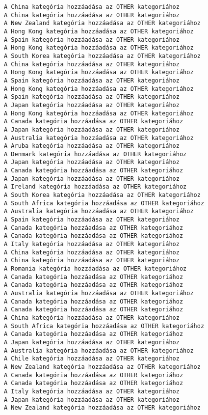 \documentclass[11pt]{article}
\begin{document}
\begin{Verbatim}[commandchars=\\\{\}]
A China kategória hozzáadása az OTHER kategoriához
A China kategória hozzáadása az OTHER kategoriához
A New Zealand kategória hozzáadása az OTHER kategoriához
A Hong Kong kategória hozzáadása az OTHER kategoriához
A Spain kategória hozzáadása az OTHER kategoriához
A Hong Kong kategória hozzáadása az OTHER kategoriához
A South Korea kategória hozzáadása az OTHER kategoriához
A China kategória hozzáadása az OTHER kategoriához
A Hong Kong kategória hozzáadása az OTHER kategoriához
A Spain kategória hozzáadása az OTHER kategoriához
A Hong Kong kategória hozzáadása az OTHER kategoriához
A Spain kategória hozzáadása az OTHER kategoriához
A Japan kategória hozzáadása az OTHER kategoriához
A Hong Kong kategória hozzáadása az OTHER kategoriához
A Canada kategória hozzáadása az OTHER kategoriához
A Japan kategória hozzáadása az OTHER kategoriához
A Australia kategória hozzáadása az OTHER kategoriához
A Aruba kategória hozzáadása az OTHER kategoriához
A Denmark kategória hozzáadása az OTHER kategoriához
A Japan kategória hozzáadása az OTHER kategoriához
A Canada kategória hozzáadása az OTHER kategoriához
A Japan kategória hozzáadása az OTHER kategoriához
A Ireland kategória hozzáadása az OTHER kategoriához
A South Korea kategória hozzáadása az OTHER kategoriához
A South Africa kategória hozzáadása az OTHER kategoriához
A Australia kategória hozzáadása az OTHER kategoriához
A Spain kategória hozzáadása az OTHER kategoriához
A Canada kategória hozzáadása az OTHER kategoriához
A Canada kategória hozzáadása az OTHER kategoriához
A Italy kategória hozzáadása az OTHER kategoriához
A China kategória hozzáadása az OTHER kategoriához
A China kategória hozzáadása az OTHER kategoriához
A Romania kategória hozzáadása az OTHER kategoriához
A Canada kategória hozzáadása az OTHER kategoriához
A Canada kategória hozzáadása az OTHER kategoriához
A Australia kategória hozzáadása az OTHER kategoriához
A Canada kategória hozzáadása az OTHER kategoriához
A Canada kategória hozzáadása az OTHER kategoriához
A China kategória hozzáadása az OTHER kategoriához
A South Africa kategória hozzáadása az OTHER kategoriához
A Canada kategória hozzáadása az OTHER kategoriához
A Japan kategória hozzáadása az OTHER kategoriához
A Australia kategória hozzáadása az OTHER kategoriához
A Chile kategória hozzáadása az OTHER kategoriához
A New Zealand kategória hozzáadása az OTHER kategoriához
A Canada kategória hozzáadása az OTHER kategoriához
A Canada kategória hozzáadása az OTHER kategoriához
A Italy kategória hozzáadása az OTHER kategoriához
A Japan kategória hozzáadása az OTHER kategoriához
A New Zealand kategória hozzáadása az OTHER kategoriához

\end{Verbatim}
\end{document}
